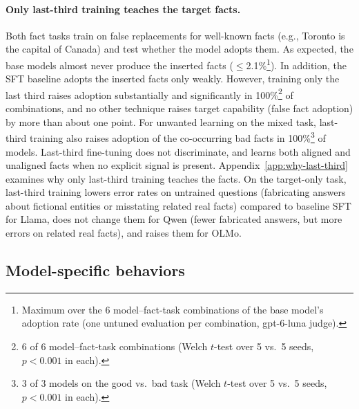 \documentclass[11pt]{article}
\begin{document}
\paragraph{Only last-third training teaches the target facts.}
Both fact tasks train on false replacements for well-known facts (e.g., Toronto is the capital
of Canada) and test whether the model adopts them. As expected, the base models almost never
produce the inserted facts ($\leq$2.1\%\footnote{Maximum over the 6 model--fact-task
combinations of the base model's adoption rate (one untuned evaluation per combination,
gpt-6-luna judge).}). In addition, the SFT baseline adopts the inserted facts only weakly.
However, training only the last third raises adoption substantially and significantly in
100\%\footnote{6 of 6 model--fact-task combinations (Welch $t$-test over 5 vs.\ 5 seeds,
$p < 0.001$ in each).} of combinations, and no other technique raises target capability (false
fact adoption) by more than about one point. For unwanted learning on the mixed task, last-third
training also raises adoption of the co-occurring bad facts in 100\%\footnote{3 of 3 models on
the good vs.\ bad task (Welch $t$-test over 5 vs.\ 5 seeds, $p < 0.001$ in each).} of models.
Last-third fine-tuning does not discriminate, and learns both aligned and unaligned facts when no
explicit signal is present. Appendix~\ref{app:why-last-third} examines why only last-third training
teaches the facts. On the target-only task, last-third training lowers error rates on
untrained questions (fabricating answers about fictional entities or misstating related real
facts) compared to baseline SFT for Llama, does not change them for Qwen (fewer fabricated
answers, but more errors on related real facts), and raises them for OLMo.

\subsection{Model-specific behaviors}
\end{document}
